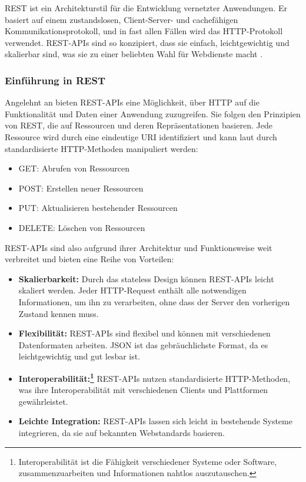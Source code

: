 REST ist ein Architekturstil für die Entwicklung vernetzter Anwendungen. Er basiert auf einem zustandslosen, Client-Server- und cachefähigen Kommunikationsprotokoll, und in fast allen Fällen wird das HTTP-Protokoll verwendet. REST-APIs sind so konzipiert, dass sie einfach, leichtgewichtig und skalierbar sind, was sie zu einer beliebten Wahl für Webdienste macht \cite{REST:2024}.

\subsubsection{Einführung in REST}
Angelehnt an \cite{REST:2024} bieten REST-APIs eine Möglichkeit, über HTTP auf die Funktionalität und Daten einer Anwendung zuzugreifen. Sie folgen den Prinzipien von REST, die auf Ressourcen und deren Repräsentationen basieren. Jede Ressource wird durch eine eindeutige URI identifiziert und kann laut \cite[S.4]{Kornienko_2021} durch standardisierte HTTP-Methoden manipuliert werden:
\begin{itemize}
	\item GET: Abrufen von Ressourcen
	\item POST: Erstellen neuer Ressourcen
	\item PUT: Aktualisieren bestehender Ressourcen
	\item DELETE: Löschen von Ressourcen
\end{itemize}

REST-APIs sind also aufgrund ihrer Architektur und Funktionsweise weit verbreitet und bieten eine Reihe von Vorteilen:

\begin{itemize}
	\item \textbf{Skalierbarkeit:} Durch das stateless Design können REST-APIs leicht skaliert werden. Jeder HTTP-Request enthält alle notwendigen Informationen, um ihn zu verarbeiten, ohne dass der Server den vorherigen Zustand kennen muss.
	\item \textbf{Flexibilität:} REST-APIs sind flexibel und können mit verschiedenen Datenformaten arbeiten. JSON ist das gebräuchlichste Format, da es leichtgewichtig und gut lesbar ist.
	\item \textbf{Interoperabilität:\footnote{Interoperabilität ist die Fähigkeit verschiedener Systeme oder Software, zusammenzuarbeiten und Informationen nahtlos auszutauschen\cite{wiki:listing}.}} REST-APIs nutzen standardisierte HTTP-Methoden, was ihre Interoperabilität mit verschiedenen Clients und Plattformen gewährleistet.
	\item \textbf{Leichte Integration:} REST-APIs lassen sich leicht in bestehende Systeme integrieren, da sie auf bekannten Webstandards basieren.
\end{itemize}

